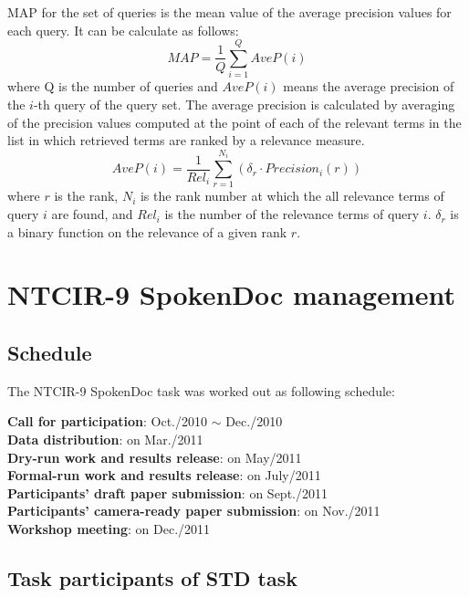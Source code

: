\documentclass[english]{jnlp_1.4}
\begin{document}
MAP for the set of queries is the mean value of the
average precision values for each query. It can be calculate as follows:
\begin{equation}
MAP = \frac{1}{Q} \sum_{i=1}^{Q} AveP(i)
\end{equation}
where Q is the number of queries and $AveP(i)$ means the average
precision of the $i$-th query of the query set.
The average precision is calculated by averaging of the precision values
computed at the point of each of the relevant terms in the list in which
retrieved terms are ranked by a relevance measure.
\begin{equation}
AveP(i) = \frac{1}{Rel_i} \sum_{r=1}^{N_i} ( {\delta}_r \cdot Precision_i(r) )
\end{equation}
where $r$ is the rank, $N_i$ is the rank number at which the all
relevance terms of query $i$ are found, and $Rel_i$ is the number of the
relevance terms of query $i$. ${\delta}_r$ is a binary function on the
relevance of a given rank $r$.



\section{NTCIR-9 SpokenDoc management}


\subsection{Schedule}

The NTCIR-9 SpokenDoc task was worked out as following schedule:

\noindent
\textbf{Call for participation}: Oct./2010 $\sim$ Dec./2010\\
\textbf{Data distribution}: on Mar./2011\\
\textbf{Dry-run work and results release}: on May/2011\\
\textbf{Formal-run work and results release}: on July/2011\\
\textbf{Participants' draft paper submission}: on Sept./2011\\
\textbf{Participants' camera-ready paper submission}: on Nov./2011\\
\textbf{Workshop meeting}: on Dec./2011


\subsection{Task participants of STD task}
\end{document}
